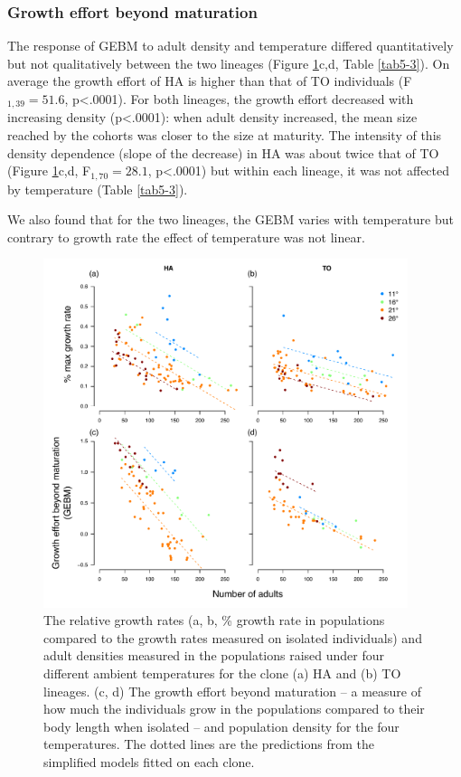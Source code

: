 \subsubsection{Growth effort beyond maturation}

The response of GEBM to adult density and temperature differed quantitatively
but not qualitatively between the two lineages (Figure \ref{Fig5-4}c,d, Table
\ref{tab5-3}).
On average the growth effort of HA is higher than that of TO individuals
(F$_{1,39}=51.6$, p<.0001). For both lineages, the growth effort decreased with
increasing density (p<.0001): when adult density increased, the mean size reached by the cohorts
was closer to the size at maturity. The intensity of this density dependence
(slope of the decrease) in HA was about twice that of TO (Figure
\ref{Fig5-4}c,d, F$_{1,70}=28.1$, p<.0001) but within each lineage, it was not
affected by temperature (Table \ref{tab5-3}).

We also found that for the two lineages, the GEBM varies with temperature but
contrary to growth rate the effect of temperature was not linear.

\begin{figure}[!h] %
\centering
\includegraphics[width=0.95\textwidth]{5_ChapExp3/fig/Fig4} 
\caption[Relative growth rates and adult
densities in populations]{ The relative growth rates (a, b, \% growth rate in
populations compared to the growth rates measured on isolated individuals) and adult densities measured in the populations raised under four different ambient temperatures for the clone
(a) HA and (b) TO lineages. (c, d) The growth effort beyond maturation -- a
measure of how much the individuals grow in the populations compared to their
body length when isolated -- and population density for the four temperatures.
The dotted lines are the predictions from the simplified models fitted on each
clone.
}
\label{Fig5-4}
\end{figure}

